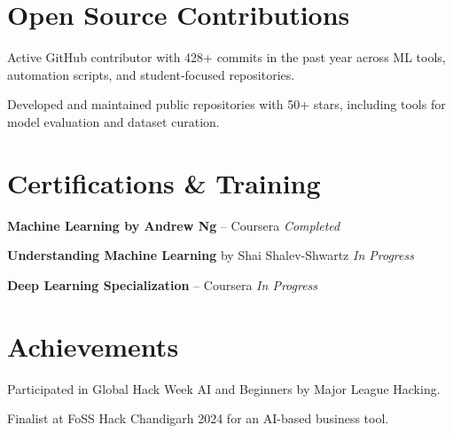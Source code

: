 \documentclass[10pt, letterpaper]{article}
\begin{document}
\section{Open Source Contributions}
\begin{achievementlist}
    \item Active GitHub contributor with 428+ commits in the past year across ML tools, automation scripts, and student-focused repositories.
    \item Developed and maintained public repositories with 50+ stars, including tools for model evaluation and dataset curation.
\end{achievementlist}

\section{Certifications \& Training}
\begin{achievementlist}
    \item \textbf{Machine Learning by Andrew Ng} -- Coursera \hfill \textit{Completed}
    \item \textbf{Understanding Machine Learning} by Shai Shalev-Shwartz \hfill \textit{In Progress}
    \item \textbf{Deep Learning Specialization} -- Coursera \hfill \textit{In Progress}
\end{achievementlist}

\section{Achievements}
\begin{achievementlist}
    \item Participated in Global Hack Week AI and Beginners by Major League Hacking.
    \item Finalist at FoSS Hack Chandigarh 2024 for an AI-based business tool.
\end{achievementlist}

\end{document}

